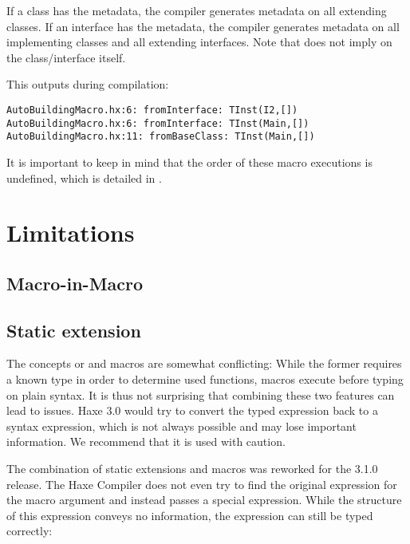 \documentclass{haxe}
\begin{document}
If a class has the  metadata, the compiler generates  metadata on all extending classes. If an interface has the  metadata, the compiler generates  metadata on all implementing classes and all extending interfaces. Note that  does not imply  on the class/interface itself.


This outputs during compilation:

\begin{lstlisting}
AutoBuildingMacro.hx:6: fromInterface: TInst(I2,[])
AutoBuildingMacro.hx:6: fromInterface: TInst(Main,[])
AutoBuildingMacro.hx:11: fromBaseClass: TInst(Main,[])
\end{lstlisting}

It is important to keep in mind that the order of these macro executions is undefined, which is detailed in .



\section{Limitations}
\label{macro-limitations}

\subsection{Macro-in-Macro}
\label{macro-limitations-macro-in-macro}

\subsection{Static extension}
\label{macro-limitations-static-extension}

The concepts or  and macros are somewhat conflicting: While the former requires a known type in order to determine used functions, macros execute before typing on plain syntax. It is thus not surprising that combining these two features can lead to issues. Haxe 3.0 would try to convert the typed expression back to a syntax expression, which is not always possible and may lose important information. We recommend that it is used with caution.


The combination of static extensions and macros was reworked for the 3.1.0 release. The Haxe Compiler does not even try to find the original expression for the macro argument and instead passes a special  expression. While the structure of this expression conveys no information, the expression can still be typed correctly:
\end{document}
